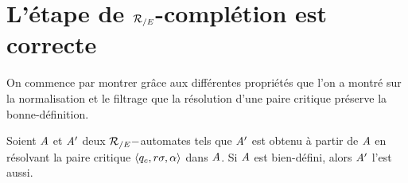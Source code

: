 \section{L'étape de ${\mathcal R_{/E}}$-complétion est correcte}

On commence par montrer grâce aux différentes propriétés que l'on a montré sur la 
normalisation et le filtrage que la résolution d'une paire critique préserve la
bonne-définition.

\begin{lemma}
  \label{lemma:C-well-defined}
  Soient $\mathit A$ et $\mathit A'$ deux ${\mathcal R_{/E}}-$automates tels que 
  $\mathit A'$ est obtenu à partir de $\mathit A$ en résolvant 
  la paire critique $\langle q_c, r\sigma,\alpha \rangle$ dans $\mathit A$. 
  Si $\mathit A$ est bien-défini, alors $\mathit A'$ l'est aussi. 
\end{lemma}
